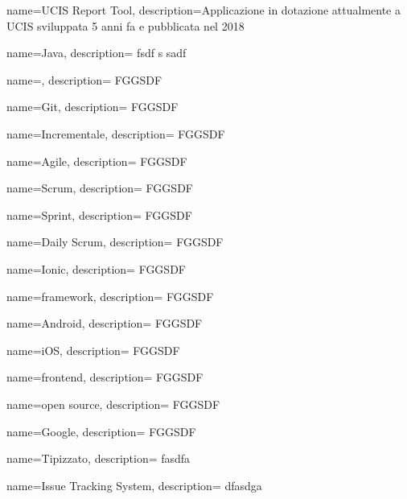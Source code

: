 {
  name=UCIS Report Tool,
  description={Applicazione in dotazione attualmente a UCIS sviluppata 5 anni fa e pubblicata nel 2018}
}

{
  name=Java,
  description={ fsdf s sadf }
}

{
  name=,
  description={ FGGSDF }
}

{
  name=Git,
  description={ FGGSDF }
}

{
  name=Incrementale,
  description={ FGGSDF }
}

{
  name=Agile,
  description={ FGGSDF }
}

{
  name=Scrum,
  description={ FGGSDF }
}

{
  name=Sprint,
  description={ FGGSDF }
}

{
  name=Daily Scrum,
  description={ FGGSDF }
}

{
  name=Ionic,
  description={ FGGSDF }
}

{
  name=framework,
  description={ FGGSDF }
}

{
  name=Android,
  description={ FGGSDF }
}

{
  name=iOS,
  description={ FGGSDF }
}

{
  name=frontend,
  description={ FGGSDF }
}

{
  name=open source,
  description={ FGGSDF }
}

{
  name=Google,
  description={ FGGSDF }
}

{
  name=Tipizzato,
  description= { fasdfa }
}

{
  name=Issue Tracking System,
  description={ dfasdga }
}
